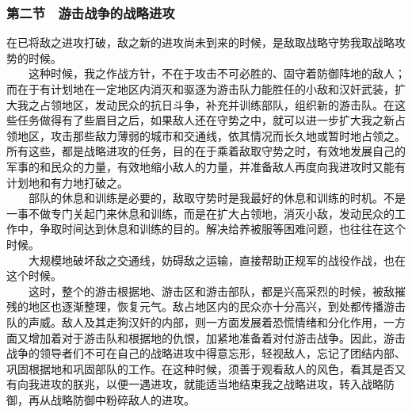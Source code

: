 \documentclass[cn,11pt,chinese]{elegantbook}
\def\myformat#1{\hfil\hfil #1}
\begin{document}
\subsubsection*{\myformat{第二节　游击战争的战略进攻}}
在已将敌之进攻打破，敌之新的进攻尚未到来的时候，是敌取战略守势我取战略攻势的时候。\\
　　这种时候，我之作战方针，不在于攻击不可必胜的、固守着防御阵地的敌人；而在于有计划地在一定地区内消灭和驱逐为游击队力能胜任的小敌和汉奸武装，扩大我之占领地区，发动民众的抗日斗争，补充并训练部队，组织新的游击队。在这些任务做得有了些眉目之后，如果敌人还在守势之中，就可以进一步扩大我之新占领地区，攻击那些敌力薄弱的城市和交通线，依其情况而长久地或暂时地占领之。所有这些，都是战略进攻的任务，目的在于乘着敌取守势之时，有效地发展自己的军事的和民众的力量，有效地缩小敌人的力量，并准备敌人再度向我进攻时又能有计划地和有力地打破之。\\
　　部队的休息和训练是必要的，敌取守势时是我最好的休息和训练的时机。不是一事不做专门关起门来休息和训练，而是在扩大占领地，消灭小敌，发动民众的工作中，争取时间达到休息和训练的目的。解决给养被服等困难问题，也往往在这个时候。\\
　　大规模地破坏敌之交通线，妨碍敌之运输，直接帮助正规军的战役作战，也在这个时候。\\
　　这时，整个的游击根据地、游击区和游击部队，都是兴高采烈的时候，被敌摧残的地区也逐渐整理，恢复元气。敌占地区内的民众亦十分高兴，到处都传播游击队的声威。敌人及其走狗汉奸的内部，则一方面发展着恐慌情绪和分化作用，一方面又增加着对于游击队和根据地的仇恨，加紧地准备着对付游击战争。因此，游击战争的领导者们不可在自己的战略进攻中得意忘形，轻视敌人，忘记了团结内部、巩固根据地和巩固部队的工作。在这种时候，须善于观看敌人的风色，看其是否又有向我进攻的朕兆，以便一遇进攻，就能适当地结束我之战略进攻，转入战略防御，再从战略防御中粉碎敌人的进攻。\\
\end{document}
